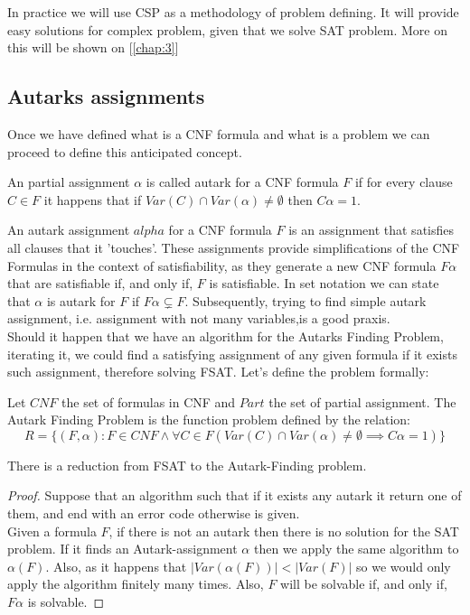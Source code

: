In practice we will use CSP as a methodology of problem defining. It will provide easy solutions for complex problem, given that we solve SAT problem. More on this will be shown on [\ref{chap:3}]


\subsection{Autarks assignments}
\label{sec:autark}

Once we have defined what is a CNF formula and what is a problem we can proceed to define this anticipated concept.

\begin{definition}
  An partial assignment $\alpha$ is called autark for a CNF formula $F$ if for every clause $C \in F$ it happens that if $Var(C) \cap Var(\alpha) \ne \emptyset $ then $C\alpha = 1$.
\end{definition}

An autark assignment $alpha$  for a CNF formula $F$ is an assignment that satisfies all clauses that it 'touches'. These assignments provide simplifications of the CNF Formulas in the context of satisfiability, as they generate a new CNF formula $F\alpha$ that are satisfiable if, and only if,  $F$ is satisfiable. In set notation we can state that $\alpha$ is autark for $F$ if $F\alpha \subsetneq F$. Subsequently, trying to find simple autark assignment, i.e. assignment with not many variables,is a good praxis.\\


Should it happen that we have an algorithm for the Autarks Finding Problem, iterating it, we could find a satisfying assignment of any given formula if it exists such assignment, therefore solving FSAT.  Let's define the problem formally:

\begin{definition}
  Let $CNF$ the set of formulas in CNF and $Part$ the set of partial assignment. The Autark Finding Problem is the function problem defined by the relation:
  $$R = \{(F,\alpha): F \in CNF\wedge \forall C \in F( Var(C)\cap Var(\alpha)\ne\emptyset \implies C\alpha=1 )\}$$
\end{definition}

\begin{proposition} There is a reduction from FSAT to the Autark-Finding problem.
  \begin{proof} Suppose that an algorithm such that if it exists any autark it return one of them, and end with an error code otherwise is given.  \\

    Given a formula $F$, if there is not an autark then there is no solution for the SAT problem. If it finds an Autark-assignment $\alpha$ then we apply the same algorithm to $\alpha(F)$. Also, as it happens that $|Var(\alpha(F))|<|Var(F)|$ so we would only apply the algorithm finitely many times. Also, $F$ will be solvable if, and only if, $F\alpha$ is solvable.
  \end{proof}
  
\end{proposition}


